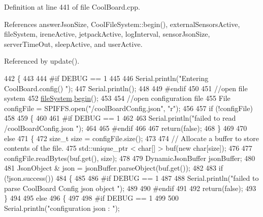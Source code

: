 Definition at line 441 of file Cool\+Board.\+cpp.



References answer\+Json\+Size, Cool\+File\+System\+::begin(), external\+Sensors\+Active, file\+System, irene\+Active, jetpack\+Active, log\+Interval, sensor\+Json\+Size, server\+Time\+Out, sleep\+Active, and user\+Active.



Referenced by update().


\begin{DoxyCode}
442 \{
443 
444 \textcolor{preprocessor}{#if DEBUG == 1}
445 
446     Serial.println(\textcolor{stringliteral}{"Entering CoolBoard.config() "});
447     Serial.println();
448 
449 \textcolor{preprocessor}{#endif}
450 
451     \textcolor{comment}{//open file system}
452     \hyperlink{classCoolBoard_a42c2586fbb13ff7f06538e9284e8538d}{fileSystem}.\hyperlink{classCoolFileSystem_a6ba6f666ed4c530174f8569d2c636748}{begin}();
453     
454     \textcolor{comment}{//open configuration file}
455     File configFile = SPIFFS.open(\textcolor{stringliteral}{"/coolBoardConfig.json"}, \textcolor{stringliteral}{"r"});
456     
457     \textcolor{keywordflow}{if} (!configFile)
458 
459     \{
460     
461 \textcolor{preprocessor}{    #if DEBUG == 1}
462 
463         Serial.println(\textcolor{stringliteral}{"failed to read /coolBoardConfig.json  "});
464 
465 \textcolor{preprocessor}{    #endif}
466     
467         \textcolor{keywordflow}{return}(\textcolor{keyword}{false});
468     \}
469 
470     \textcolor{keywordflow}{else}
471     \{
472         \textcolor{keywordtype}{size\_t} size = configFile.size();
473 
474         \textcolor{comment}{// Allocate a buffer to store contents of the file.}
475         std::unique\_ptr < char[] > buf(\textcolor{keyword}{new} \textcolor{keywordtype}{char}[size]);
476 
477         configFile.readBytes(buf.get(), size);
478 
479         DynamicJsonBuffer jsonBuffer;
480 
481         JsonObject & json = jsonBuffer.parseObject(buf.get());
482 
483         \textcolor{keywordflow}{if} (!json.success())
484         \{
485         
486 \textcolor{preprocessor}{        #if DEBUG == 1}
487 
488             Serial.println(\textcolor{stringliteral}{"failed to parse CoolBoard Config json object "});
489     
490 \textcolor{preprocessor}{        #endif}
491 
492             \textcolor{keywordflow}{return}(\textcolor{keyword}{false});
493         \}
494 
495         \textcolor{keywordflow}{else}
496         \{   
497         
498 \textcolor{preprocessor}{        #if DEBUG == 1}
499             
500             Serial.println(\textcolor{stringliteral}{"configuration json : "});

\end{DoxyCode}
